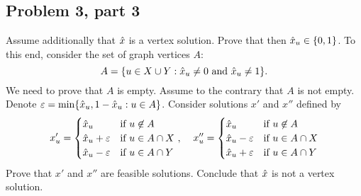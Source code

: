 \subsection{Problem 3, part 3}
Assume additionally that $\hat{x}$ is a vertex solution. Prove that then $\hat{x}_u \in \{0, 1\}$. To this end, consider the set of graph vertices $A$:
\[A = \{ u \in X \cup Y : \hat{x}_u \neq 0 \text{ and } \hat{x}_u \neq 1\}.\]
We need to prove that $A$ is empty. Assume to the contrary that $A$ is not empty. Denote $\varepsilon = \min \{ \hat{x}_u , 1 - \hat{x}_u : u \in A\}$. Consider solutions $x'$ and $x''$ defined by
\begin{equation*}
    x'_u = \begin{cases}
        \hat{x}_u &\text{if } u \not \in  A\\
        \hat{x}_u + \varepsilon &\text{if } u \in A\cap X \ ,\\
        \hat{x}_u - \varepsilon &\text{if } u \in A\cap Y\\
    \end{cases}\quad
    x''_u = \begin{cases}
        \hat{x}_u &\text{if } u \not \in A\\
        \hat{x}_u - \varepsilon &\text{if } u \in A\cap X\\
        \hat{x}_u + \varepsilon &\text{if } u \in A\cap Y\\
    \end{cases}
\end{equation*}
Prove that $x'$ and $x''$ are feasible solutions. Conclude that $\hat{x}$ is not a vertex solution. 
\partbreak
